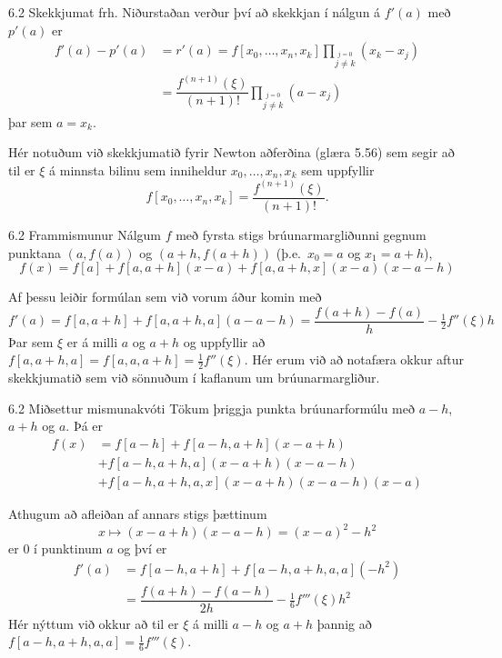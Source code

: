 \begin{frame}{6.2 Skekkjumat frh.}
Niðurstaðan verður því að skekkjan í nálgun á $f'(a)$ með $p'(a)$ er
\begin{align*}
  f'(a) - p'(a) &= r'(a)
=f[x_0,\dots,x_n,x_k]
\prod_{\stackrel{j=0}{j \not= k}} (x_k-x_j)\\
&=\dfrac{f^{(n+1)}(\xi)}{(n+1)!}
  \prod_{\stackrel{j=0}{j \not= k}} (a-x_j)
\end{align*}
þar sem $a=x_k$.

\pause
\smallskip
Hér notuðum við skekkjumatið fyrir Newton aðferðina (glæra 5.56) sem segir að 
til er $\xi$ á minnsta bilinu sem inniheldur $x_0,\ldots,x_n,x_k$ sem uppfyllir
$$
  f[x_0,\ldots,x_n,x_k] = \frac{f^{(n+1)}(\xi)}{(n+1)!}.
$$
\end{frame}


\begin{frame}{6.2 Frammismunur} 
Nálgum $f$ með fyrsta stigs
brúunarmargliðunni gegnum punktana $(a,f(a))$ og $(a+h,f(a+h))$
(þ.e.~$x_0 = a$ og $x_1 = a+h$),
$$
  f(x)=f[a]+f[a,a+h](x-a)+f[a,a+h,x](x-a)(x-a-h)
$$ 

\pause
\smallskip
Af þessu leiðir formúlan sem við vorum áður komin með
$$
  f'(a)=f[a,a+h]+f[a,a+h,a](a-a-h)
  =\dfrac{f(a+h)-f(a)}h-\tfrac 12 f''(\xi)h
$$ 
Þar sem $\xi$ er á milli 
$a$ og $a+h$ og uppfyllir að $f[a,a+h,a]=f[a,a,a+h]=\tfrac 12f''(\xi)$.
Hér erum við að notafæra okkur aftur skekkjumatið sem við sönnuðum  í kaflanum
um brúunarmargliður.
\end{frame}


\begin{frame}{6.2 Miðsettur mismunakvóti} 
Tökum þriggja punkta brúunarformúlu með $a-h$, $a+h$ og
$a$.  Þá er
\begin{align*}
  f(x)&=f[a-h]+f[a-h,a+h](x-a+h)\\
  &+f[a-h,a+h,a](x-a+h)(x-a-h)\\
  &+f[a-h,a+h,a,x](x-a+h)(x-a-h)(x-a)
\end{align*}

\pause
\smallskip
Athugum að afleiðan af annars stigs þættinum
$$
  x\mapsto (x-a+h)(x-a-h)=(x-a)^2-h^2
$$
er $0$ í punktinum $a$ og því er
\begin{align*}
  f'(a)&=f[a-h,a+h]+f[a-h,a+h,a,a](-h^2)\\
  &=\dfrac{f(a+h)-f(a-h)}{2h}-\tfrac 16 f'''(\xi)h^2 
\end{align*}
Hér nýttum við okkur að til er $\xi$ á milli 
$a-h$ og $a+h$ þannig að $f[a-h,a+h,a,a]=\tfrac 16 f'''(\xi)$.
\end{frame}


